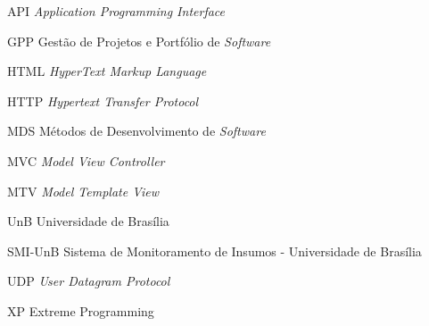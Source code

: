 \begin{siglas}
  \item[API] \textit{Application Programming Interface}
  \item[GPP] Gestão de Projetos e Portfólio de \textit{Software}
  \item[HTML] \textit{HyperText Markup Language}
  \item[HTTP] \textit{Hypertext Transfer Protocol}
  \item[MDS] Métodos de Desenvolvimento de \textit{Software}
  \item[MVC] \textit{Model View Controller}
  \item[MTV] \textit{Model Template View}
  \item[UnB] Universidade de Brasília
  \item[SMI-UnB] Sistema de Monitoramento de Insumos - Universidade de Brasília
  \item[UDP] \textit{User Datagram Protocol}
  \item[XP] Extreme Programming
\end{siglas}